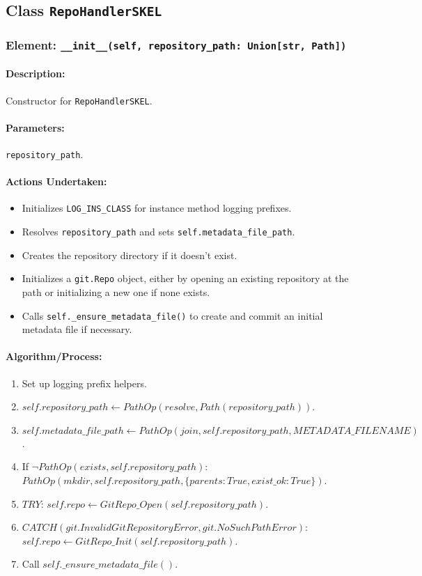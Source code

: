 \documentclass{article}
\begin{document}
\subsection{Class \texttt{RepoHandlerSKEL}}
\subsubsection{Element: \texttt{\_\_init\_\_(self, repository\_path: Union[str, Path])}}
\paragraph{Description:} Constructor for \texttt{RepoHandlerSKEL}.
\paragraph{Parameters:} \texttt{repository\_path}.
\paragraph{Actions Undertaken:}
\begin{itemize}
    \item Initializes \texttt{LOG\_INS\_CLASS} for instance method logging prefixes.
    \item Resolves \texttt{repository\_path} and sets \texttt{self.metadata\_file\_path}.
    \item Creates the repository directory if it doesn't exist.
    \item Initializes a \texttt{git.Repo} object, either by opening an existing repository at the path or initializing a new one if none exists.
    \item Calls \texttt{self.\_ensure\_metadata\_file()} to create and commit an initial metadata file if necessary.
\end{itemize}
\paragraph{Algorithm/Process:}
\begin{enumerate}
    \item Set up logging prefix helpers.
    \item $self.repository\_path \leftarrow PathOp(resolve, Path(repository\_path))$.
    \item $self.metadata\_file\_path \leftarrow PathOp(join, self.repository\_path, METADATA\_FILENAME)$.
    \item If $\neg PathOp(exists, self.repository\_path)$: $PathOp(mkdir, self.repository\_path, \{parents:True, exist\_ok:True\})$.
    \item $TRY$: $self.repo \leftarrow GitRepo\_Open(self.repository\_path)$.
    \item $CATCH (git.InvalidGitRepositoryError, git.NoSuchPathError)$: $self.repo \leftarrow GitRepo\_Init(self.repository\_path)$.
    \item Call $self.\_ensure\_metadata\_file()$.
\end{enumerate}
\end{document}
